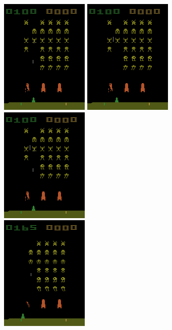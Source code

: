 \begin{figure}
\centering
\captionsetup{justification=centering}
\begin{multicols}{3}
    \includegraphics[scale=0.8]{figures/related_work/space_invaders_341_rgb_even.png}\par 
    \includegraphics[scale=0.8]{figures/related_work/space_invaders_341_rgb_odd.png}\par
    \includegraphics[scale=0.8]{figures/related_work/space_invaders_341_rgb_maximum_of_even_odd.png}\par    
    \end{multicols}
\begin{multicols}{3}
    \includegraphics[scale=0.8]{figures/related_work/space_invaders_831_rgb_even.png}\par

\end{multicols}
\end{figure}
